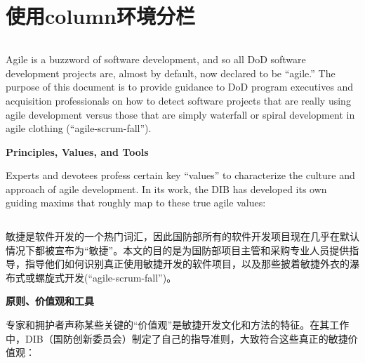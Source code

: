 \documentclass[UTF8, oneside]{ctexbook}
\begin{document}
\section{使用column环境分栏}
\begin{paracol}{2}
  \begin{column}
    Agile is a buzzword of software development, and so all DoD software development projects are, almost by default, now declared to be “agile.” The purpose of this document is to provide guidance to DoD program executives and acquisition professionals on how to detect software projects that are really using agile development versus those that are simply waterfall or spiral development in agile clothing (“agile-scrum-fall”).
    
    \large\textbf{Principles, Values, and Tools}
    
    Experts and devotees profess certain key “values” to characterize the culture and approach of agile development. In its work, the DIB has developed its own guiding maxims that roughly map to these true agile values:
  \end{column}
  
  \begin{column}
    敏捷是软件开发的一个热门词汇，因此国防部所有的软件开发项目现在几乎在默认情况下都被宣布为“敏捷”。本文的目的是为国防部项目主管和采购专业人员提供指导，指导他们如何识别真正使用敏捷开发的软件项目，以及那些披着敏捷外衣的瀑布式或螺旋式开发(“agile-scrum-fall”)。

    \large\textbf{原则、价值观和工具}

    专家和拥护者声称某些关键的“价值观”是敏捷开发文化和方法的特征。在其工作中，DIB（国防创新委员会）制定了自己的指导准则，大致符合这些真正的敏捷价值观：
  \end{column}
\end{paracol}
\end{document}
